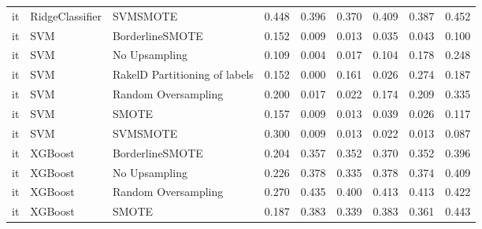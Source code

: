 \begin{tabular}{lllllllll}
      it &                 RidgeClassifier &                      SVMSMOTE & 0.448 &                     0.396 &                 0.370 &                  0.409 &                                   0.387 &     0.452 \\
      it &                             SVM &               BorderlineSMOTE & 0.152 &                     0.009 &                 0.013 &                  0.035 &                                   0.043 &     0.100 \\
      it &                             SVM &                 No Upsampling & 0.109 &                     0.004 &                 0.017 &                  0.104 &                                   0.178 &     0.248 \\
      it &                             SVM & RakelD Partitioning of labels & 0.152 &                     0.000 &                 0.161 &                  0.026 &                                   0.274 &     0.187 \\
      it &                             SVM &           Random Oversampling & 0.200 &                     0.017 &                 0.022 &                  0.174 &                                   0.209 &     0.335 \\
      it &                             SVM &                         SMOTE & 0.157 &                     0.009 &                 0.013 &                  0.039 &                                   0.026 &     0.117 \\
      it &                             SVM &                      SVMSMOTE & 0.300 &                     0.009 &                 0.013 &                  0.022 &                                   0.013 &     0.087 \\
      it &                         XGBoost &               BorderlineSMOTE & 0.204 &                     0.357 &                 0.352 &                  0.370 &                                   0.352 &     0.396 \\
      it &                         XGBoost &                 No Upsampling & 0.226 &                     0.378 &                 0.335 &                  0.378 &                                   0.374 &     0.409 \\
      it &                         XGBoost &           Random Oversampling & 0.270 &                     0.435 &                 0.400 &                  0.413 &                                   0.413 &     0.422 \\
      it &                         XGBoost &                         SMOTE & 0.187 &                     0.383 &                 0.339 &                  0.383 &                                   0.361 &     0.443 \\

\end{tabular}
